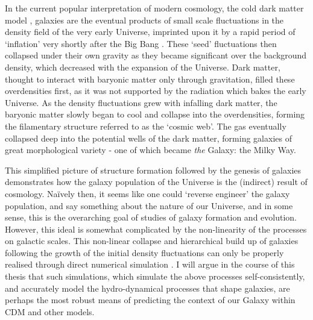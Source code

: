 In the current popular interpretation of modern cosmology, the cold dark matter model \citep[CDM, e.g.][]{1978MNRAS.183..341W}, galaxies are the eventual products of small scale fluctuations in the density field of the very early Universe, imprinted upon it by a rapid period of `inflation' very shortly after the Big Bang \citep{guth1981inflationary}. These `seed' fluctuations then collapsed under their own gravity as they became significant over the background density, which decreased with the expansion of the Universe. Dark matter, thought to interact with baryonic matter only through gravitation, filled these overdensities first, as it was not supported by the radiation which bakes the early Universe. As the density fluctuations grew with infalling dark matter, the baryonic matter slowly began to cool and collapse into the overdensities, forming the filamentary structure referred to as the `cosmic web'. The gas eventually collapsed deep into the potential wells of the dark matter, forming galaxies of great morphological variety - one of which became \emph{the} Galaxy: the Milky Way.

This simplified picture of structure formation followed by the genesis of galaxies demonstrates how the galaxy population of the Universe is the (indirect) result of cosmology. Na\"ively then, it seems like one could `reverse engineer' the galaxy population, and say something about the nature of our Universe, and in some sense, this is the overarching goal of studies of galaxy formation and evolution. However, this ideal is somewhat complicated by the non-linearity of the processes on galactic scales. This non-linear collapse and hierarchical build up of galaxies following the growth of the initial density fluctuations can only be properly realised through direct numerical simulation \citep[e.g.][]{2005Natur.435..629S}. I will argue in the course of this thesis that such simulations, which simulate the above processes self-consistently, and accurately model the hydro-dynamical processes that shape galaxies, are perhaps the most robust means of predicting the context of our Galaxy within CDM and other models.

